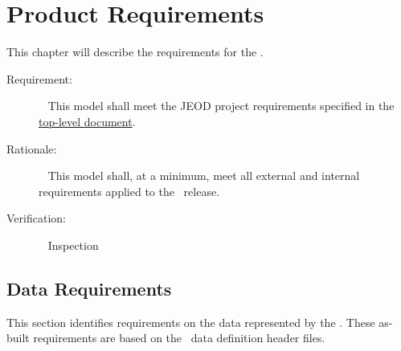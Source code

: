 \chapter{Product Requirements}\label{ch:reqt}

This chapter will describe the requirements for the \aerodynamicsDesc.

\label{reqt:toplevel}
\begin{description}
\item[Requirement:]\ \newline
  This model shall meet the JEOD project requirements specified in
  the \JEODid\
  \hyperref{file:\JEODHOME/docs/JEOD.pdf}{part1}{reqt}{ top-level
  document}.
\item[Rationale:]\ \newline
  This model shall, at a minimum,  meet all external and internal requirements
  applied to the \JEODid\ release.
\item[Verification:]\ \newline
     Inspection
\end{description}

%
%
%
%
%
\section{Data Requirements}\label{sec:data_reqts}
This section identifies requirements on the data represented by the \aerodynamicsDesc.
These as-built requirements are based on the \aerodynamicsDesc\ data definition header files.

